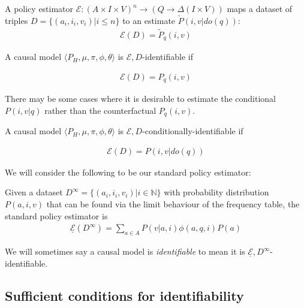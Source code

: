 \begin{definition}
A policy estimator $\mathscr{E}:(A\times I \times V)^n\to (Q\to \Delta(I\times V))$ maps a dataset of triples $D=\{(a_i,i_i,v_i)|i\leq n\}$ to an estimate $\tilde{P}(i,v|do(q))$:
\begin{align}
    \mathscr{E}(D) = \tilde{P}_q(i,v)
\end{align}
\end{definition}

\begin{definition}
A causal model $\langle P_H, \mu,\pi,\phi,\theta\rangle$ is $\mathscr{E},D$-identifiable if 

\begin{align}
    \mathscr{E}(D)=P_q(i,v)
\end{align}
\end{definition}

There may be some cases where it is desirable to estimate the conditional $P(i,v|q)$ rather than the counterfactual $P_q(i,v)$.

\begin{definition}
A causal model $\langle P_H, \mu,\pi,\phi,\theta\rangle$ is $\mathscr{E},D$-conditionally-identifiable if 

\begin{align}
    \mathscr{E}(D)=P(i,v|do(q))
\end{align}
\end{definition}

We will consider the following to be our standard policy estimator:

\begin{definition}
Given a dataset $D^\infty=\{(a_i,i_i,v_i)|i\in\mathbb{N}\}$ with probability distribution $P(a,i,v)$ that can be found via the limit behaviour of the frequency table, the standard policy estimator is
\begin{align}
    \underline{\mathscr{E}}(D^\infty) = \sum_{a\in A} P(v|a,i) \phi(a,q,i) P(a)
\end{align}
\end{definition}

We will sometimes say a causal model is \emph{identifiable} to mean it is $\underline{\mathscr{E}}, D^\infty$-identifiable.

\subsection{Sufficient conditions for identifiability}

